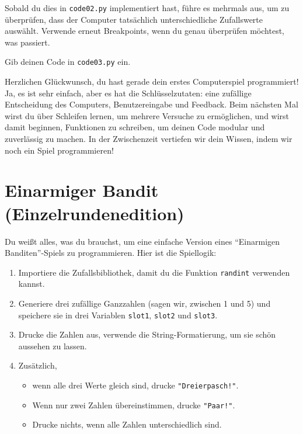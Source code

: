 \documentclass[
]{book}
\providecommand{\tightlist}{%
  \setlength{\itemsep}{0pt}\setlength{\parskip}{0pt}}
\begin{document}
Sobald du dies in \texttt{code02.py} implementiert hast, führe es mehrmals aus, um zu überprüfen, dass der Computer tatsächlich unterschiedliche Zufallswerte auswählt. Verwende erneut Breakpoints, wenn du genau überprüfen möchtest, was passiert.

Gib deinen Code in \texttt{code03.py} ein.

Herzlichen Glückwunsch, du hast gerade dein erstes Computerspiel programmiert! Ja, es ist sehr einfach, aber es hat die Schlüsselzutaten: eine zufällige Entscheidung des Computers, Benutzereingabe und Feedback. Beim nächsten Mal wirst du über Schleifen lernen, um mehrere Versuche zu ermöglichen, und wirst damit beginnen, Funktionen zu schreiben, um deinen Code modular und zuverlässig zu machen. In der Zwischenzeit vertiefen wir dein Wissen, indem wir noch ein Spiel programmieren!

\hypertarget{einarmiger-bandit-einzelrundenedition}{%
\section{Einarmiger Bandit (Einzelrundenedition)}\label{einarmiger-bandit-einzelrundenedition}}

Du weißt alles, was du brauchst, um eine einfache Version eines ``Einarmigen Banditen''-Spiels zu programmieren. Hier ist die Spiellogik:

\begin{enumerate}
\def\labelenumi{\arabic{enumi}.}
\tightlist
\item
  Importiere die Zufallsbibliothek, damit du die Funktion \texttt{randint} verwenden kannst.
\item
  Generiere drei zufällige Ganzzahlen (sagen wir, zwischen 1 und 5) und speichere sie in drei Variablen \texttt{slot1}, \texttt{slot2} und \texttt{slot3}.
\item
  Drucke die Zahlen aus, verwende die String-Formatierung, um sie schön aussehen zu lassen.
\item
  Zusätzlich,

  \begin{itemize}
  \tightlist
  \item
    wenn alle drei Werte gleich sind, drucke \texttt{"Dreierpasch!"}.
  \item
    Wenn nur zwei Zahlen übereinstimmen, drucke \texttt{"Paar!"}.
  \item
    Drucke nichts, wenn alle Zahlen unterschiedlich sind.
  \end{itemize}
\end{enumerate}
\end{document}
